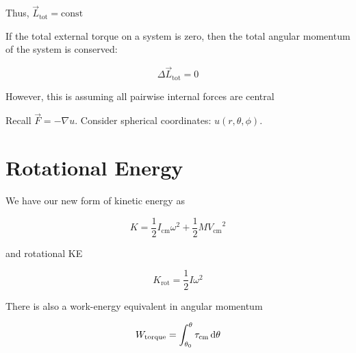 Thus, $\vec L_\mathrm{tot} = \text{const}$

\begin{theorem}
	If the total external torque on a system is zero, then the total angular momentum of the system is conserved:

	\begin{equation}
		\Delta \vec L_\mathrm{tot} = 0
	\end{equation}

	\begin{remark}
		However, this is assuming all pairwise internal forces are central
	\end{remark}
\end{theorem}

Recall $\vec F = -\nabla u$. Consider spherical coordinates: $u(r,\theta,\phi)$.


\section{Rotational Energy}


\begin{definition}
	We have our new form of kinetic energy as

	\begin{equation}
		K = \frac{1}{2} I_\mathrm{cm} \omega^2 + \frac{1}{2} M {V_\mathrm{cm}}^2
	\end{equation}

	and rotational KE

	\begin{equation}
		K_\mathrm{rot} = \frac{1}{2} I \omega^2
	\end{equation}
\end{definition}

There is also a work-energy equivalent in angular momentum

\begin{equation}
	W_\mathrm{torque} = \int_{\theta_0}^\theta \tau_\mathrm{cm} \D \theta
\end{equation}